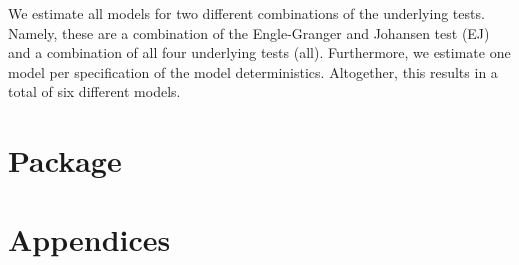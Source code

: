 \documentclass[12pt,a4paper]{article}
\begin{document}
We estimate all models for two different combinations of the underlying
tests. Namely, these are a combination of the Engle-Granger and Johansen
test (EJ) and a combination of all four underlying tests (all).
Furthermore, we estimate one model per specification of the model
deterministics. Altogether, this results in a total of six different
models.

\hypertarget{package}{%
\section{Package}\label{package}}

\pagebreak

\setcounter{page}{3}
\printbibliography[title = References]
\cleardoublepage

\begin{refsection}
\nocite{R-base}
\nocite{R-stargazer}
\nocite{R-stringr}
\nocite{R-tidyr}
\nocite{R-dplyr}
\nocite{R-glmnet}
\nocite{R-class}
\nocite{R-MASS}
\nocite{R-plm}
\nocite{R-leaps}
\nocite{R-caret}
\nocite{R-tree}
\nocite{R-gbm}
\nocite{R-plotmo}
\nocite{R-pls}
\nocite{R-splines}
\nocite{R-tictoc}
\nocite{R-plotly}
\nocite{R-inspectdf}
\nocite{R-rpart}
\nocite{R-rpart.plot}
\nocite{R-stargazer}
\nocite{R-knitr}
\nocite{R-purrr}
\nocite{R-randomForest}
\nocite{R-rstudioapi}





\nocite{R-Studio}

\printbibliography[title = Software-References]
\end{refsection}

\cleardoublepage
\appendix
\setcounter{table}{0}
\setcounter{figure}{0}
\renewcommand{\thetable}{A\arabic{table}}
\renewcommand{\thefigure}{A\arabic{figure}}


\hypertarget{appendices}{%
\section{Appendices}\label{appendices}}
\end{document}
